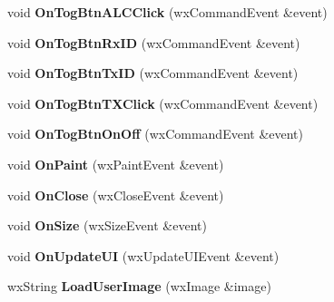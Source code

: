 \begin{DoxyCompactItemize}
\item 
\hypertarget{class_main_frame_ab1371babf6ebc9e24211a3ada34ab666}{void {\bfseries On\-Tog\-Btn\-A\-L\-C\-Click} (wx\-Command\-Event \&event)}\label{class_main_frame_ab1371babf6ebc9e24211a3ada34ab666}

\item 
\hypertarget{class_main_frame_a242e28aff7e479e59afccfaffb8b8e85}{void {\bfseries On\-Tog\-Btn\-Rx\-I\-D} (wx\-Command\-Event \&event)}\label{class_main_frame_a242e28aff7e479e59afccfaffb8b8e85}

\item 
\hypertarget{class_main_frame_a2bcfb5c59829cca3136f4bbc3989cf79}{void {\bfseries On\-Tog\-Btn\-Tx\-I\-D} (wx\-Command\-Event \&event)}\label{class_main_frame_a2bcfb5c59829cca3136f4bbc3989cf79}

\item 
\hypertarget{class_main_frame_a4bb33d30636a8cad4693412bc25337b7}{void {\bfseries On\-Tog\-Btn\-T\-X\-Click} (wx\-Command\-Event \&event)}\label{class_main_frame_a4bb33d30636a8cad4693412bc25337b7}

\item 
\hypertarget{class_main_frame_a7fc4afa20b92ac8e5f1ddfcf86820f28}{void {\bfseries On\-Tog\-Btn\-On\-Off} (wx\-Command\-Event \&event)}\label{class_main_frame_a7fc4afa20b92ac8e5f1ddfcf86820f28}

\item 
\hypertarget{class_main_frame_a2977ee86cf7f80eda32e6a900d47ab81}{void {\bfseries On\-Paint} (wx\-Paint\-Event \&event)}\label{class_main_frame_a2977ee86cf7f80eda32e6a900d47ab81}

\item 
\hypertarget{class_main_frame_a9f6f7f89d8b9aded1334cfa6eaca22bc}{void {\bfseries On\-Close} (wx\-Close\-Event \&event)}\label{class_main_frame_a9f6f7f89d8b9aded1334cfa6eaca22bc}

\item 
\hypertarget{class_main_frame_a8fd9580d3191784843f34269810a676b}{void {\bfseries On\-Size} (wx\-Size\-Event \&event)}\label{class_main_frame_a8fd9580d3191784843f34269810a676b}

\item 
\hypertarget{class_main_frame_a4757c5d7d0e9b2c98dc34336f1dce49e}{void {\bfseries On\-Update\-U\-I} (wx\-Update\-U\-I\-Event \&event)}\label{class_main_frame_a4757c5d7d0e9b2c98dc34336f1dce49e}

\item 
\hypertarget{class_main_frame_a2577b78ec0105922e5356287519d2e54}{wx\-String {\bfseries Load\-User\-Image} (wx\-Image \&image)}\label{class_main_frame_a2577b78ec0105922e5356287519d2e54}

\end{DoxyCompactItemize}
